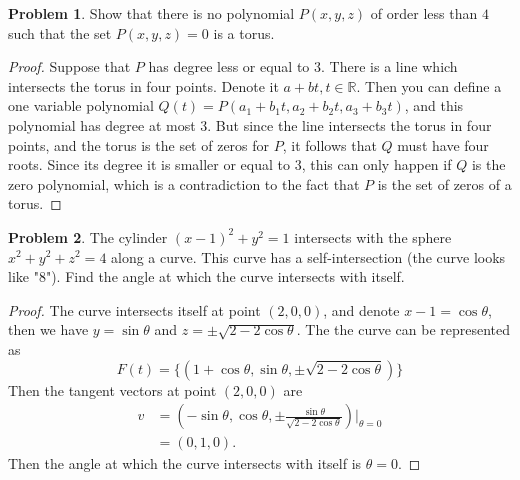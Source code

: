 \documentclass[11pt]{article}
\theoremstyle{definition}
\newtheorem{problem}{Problem}
\theoremstyle{definition}
\begin{document}
\medskip

\begin{problem}
Show that there is no polynomial $P(x,y,z)$ of order less than $4$ such that the set $P(x,y,z)=0$ is a torus.
\end{problem}
\begin{proof}
Suppose that $P$ has degree less or equal to $3$. There is a line which intersects the torus in four points. Denote it $a+bt, t \in \mathbb{R}$. Then you can define a one variable polynomial $Q(t) = P(a_1+b_1t,a_2+b_2t,a_3+b_3t)$, and this polynomial has degree at most $3$. But since the line intersects the torus in four points, and the torus is the set of zeros for $P$, it follows that $Q$ must have four roots. Since its degree it is smaller or equal to $3$, this can only happen if $Q$ is the zero polynomial, which is a contradiction to the fact that $P$ is the set of zeros of a torus\cite{2}.
\end{proof}

\medskip


\begin{problem}
The cylinder $(x-1)^2+y^2 = 1$ intersects with the sphere $x^2+y^2+z^2=4$ along a curve. This curve has a self-intersection (the curve looks like "8"). Find the angle at which the curve intersects with itself.
\end{problem}
\begin{proof}
The curve intersects itself at point $(2,0,0)$, and denote $x - 1 = \cos \theta$, then we have $y = \sin \theta$ and $z = \pm \sqrt{2 - 2\cos \theta}$. The the curve can be represented as 
$$F(t) = \{(1+\cos \theta, \sin \theta, \pm \sqrt{2 - 2\cos \theta} )\}$$
Then the tangent vectors at point $(2,0,0)$ are 
\begin{align*}
    v & = \left(-\sin \theta, \cos \theta, \pm \frac{\sin \theta}{\sqrt{2 - 2\cos \theta}}\right)\Bigg|_{\theta = 0} \\
    & = \left(0, 1, 0\right).
\end{align*}
Then the angle at which the curve intersects with itself is $\theta = 0$.
\end{proof}

\medskip
\end{document}
